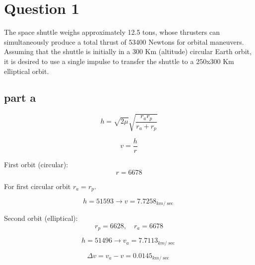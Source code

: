 \section{Question 1}
The space shuttle weighs approximately 12.5 tons, whose thrusters can simultaneously produce a total thrust of 53400 Newtons for orbital maneuvers. Assuming that the shuttle is initially in a 300 Km (altitude) circular Earth orbit, it is desired to use a single impulse to transfer the shuttle to a 250x300 Km elliptical orbit.
\subsection{part a}

$$
h = 
\sqrt{2\mu}\sqrt{\dfrac{r_a r_p}{r_a + r_p}}
$$

$$
v = \dfrac{h}{r}
$$

First orbit (circular):
$$
r = 6678
$$

For first circular orbit $r_a = r_p$.

$$
h = 51593 \to v = 7.7258_{km/\sec}
$$

Second orbit (elliptical):
$$
r_p = 6628, \quad r_a = 6678
$$

$$
h = 51496 \to v_a = 7.7113_{km/\sec}
$$

$$
\Delta v = v_a - v = 0.0145_{km/\sec}
$$